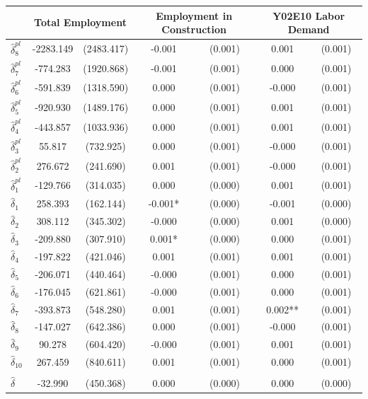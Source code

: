{
\def\sym#1{\ifmmode^{#1}\else\(^{#1}\)\fi}
\begin{tabular}{l*{3}{cc}}
\toprule
            &\multicolumn{2}{c}{Total Employment}&\multicolumn{2}{c}{Employment in Construction}&\multicolumn{2}{c}{Y02E10 Labor Demand}\\
\midrule
$\hat{\delta}_8^{pl}$&   -2283.149   &  (2483.417)&      -0.001   &     (0.001)&       0.001   &     (0.001)\\
$\hat{\delta}_7^{pl}$&    -774.283   &  (1920.868)&      -0.001   &     (0.001)&       0.000   &     (0.001)\\
$\hat{\delta}_6^{pl}$&    -591.839   &  (1318.590)&       0.000   &     (0.001)&      -0.000   &     (0.001)\\
$\hat{\delta}_5^{pl}$&    -920.930   &  (1489.176)&       0.000   &     (0.001)&       0.001   &     (0.001)\\
$\hat{\delta}_4^{pl}$&    -443.857   &  (1033.936)&       0.000   &     (0.001)&       0.001   &     (0.001)\\
$\hat{\delta}_3^{pl}$&      55.817   &   (732.925)&       0.000   &     (0.001)&      -0.000   &     (0.001)\\
$\hat{\delta}_2^{pl}$&     276.672   &   (241.690)&       0.001   &     (0.001)&      -0.000   &     (0.001)\\
$\hat{\delta}_1^{pl}$&    -129.766   &   (314.035)&       0.000   &     (0.000)&       0.001   &     (0.001)\\
$\hat{\delta}_1$&     258.393   &   (162.144)&      -0.001*  &     (0.000)&      -0.001   &     (0.000)\\
$\hat{\delta}_2$&     308.112   &   (345.302)&      -0.000   &     (0.000)&       0.001   &     (0.000)\\
$\hat{\delta}_3$&    -209.880   &   (307.910)&       0.001*  &     (0.000)&       0.000   &     (0.001)\\
$\hat{\delta}_4$&    -197.822   &   (421.046)&       0.001   &     (0.001)&       0.001   &     (0.001)\\
$\hat{\delta}_5$&    -206.071   &   (440.464)&      -0.000   &     (0.001)&       0.000   &     (0.001)\\
$\hat{\delta}_6$&    -176.045   &   (621.861)&      -0.000   &     (0.001)&       0.000   &     (0.001)\\
$\hat{\delta}_7$&    -393.873   &   (548.280)&       0.001   &     (0.001)&       0.002** &     (0.001)\\
$\hat{\delta}_8$&    -147.027   &   (642.386)&       0.000   &     (0.001)&      -0.000   &     (0.001)\\
$\hat{\delta}_9$&      90.278   &   (604.420)&      -0.000   &     (0.001)&       0.001   &     (0.001)\\
$\hat{\delta}_{10}$&     267.459   &   (840.611)&       0.001   &     (0.001)&       0.000   &     (0.001)\\
\addlinespace&               &            &               &            &               &            \\
$\hat{\delta}$&     -32.990   &   (450.368)&       0.000   &     (0.000)&       0.000   &     (0.000)\\
\bottomrule
\end{tabular}
}
